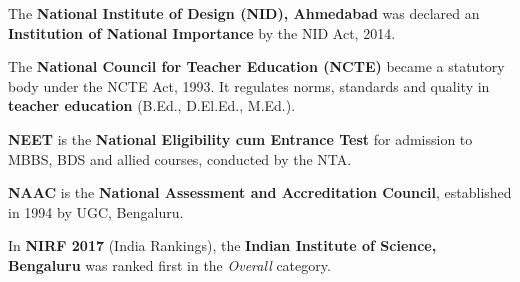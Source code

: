The \textbf{National Institute of Design (NID), Ahmedabad} was declared an \textbf{Institution of National Importance} by the NID Act, 2014.

The \textbf{National Council for Teacher Education (NCTE)} became a statutory body under the NCTE Act, 1993. It regulates norms, standards and quality in \textbf{teacher education} (B.Ed., D.El.Ed., M.Ed.).

\textbf{NEET} is the \textbf{National Eligibility cum Entrance Test} for admission to MBBS, BDS and allied courses, conducted by the NTA.

\textbf{NAAC} is the \textbf{National Assessment and Accreditation Council}, established in 1994 by UGC, Bengaluru.

In \textbf{NIRF 2017} (India Rankings), the \textbf{Indian Institute of Science, Bengaluru} was ranked first in the \emph{Overall} category.
